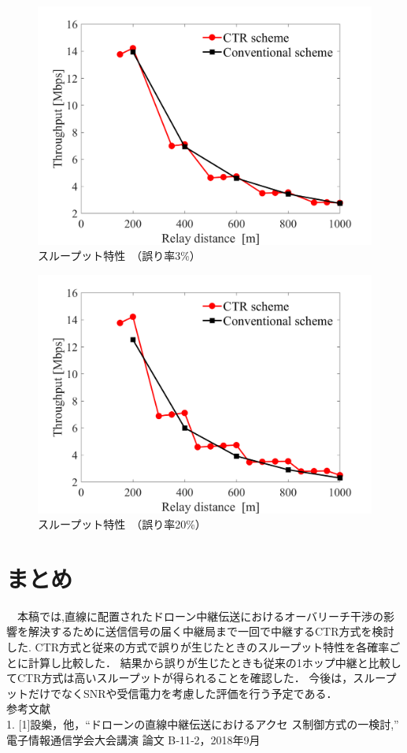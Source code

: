 \documentclass[a4paper,10pt]{ltjsarticle}
\begin{document}
\begin{figure}[H]
  \centering
  \includegraphics[width=\linewidth]{throughput_probabilistic_retry_0.03.png} %
  \caption{スループット特性　（誤り率3\%）}
  \label{fig:throughput_0.03} %
\end{figure}
\begin{figure}[H]
  \centering
  \includegraphics[width=\linewidth]{throughput_probabilistic_retry_0.2.png} %
  \caption{スループット特性　（誤り率20\%）}
  \label{fig:throughput_0.2} %
\end{figure}
\section{まとめ}
　本稿では,直線に配置されたドローン中継伝送におけるオーバリーチ干渉の影響を解決するために送信信号の届く中継局まで一回で中継するCTR方式を検討した.
CTR方式と従来の方式で誤りが生じたときのスループット特性を各確率ごとに計算し比較した．
結果から誤りが生じたときも従来の1ホップ中継と比較してCTR方式は高いスループットが得られることを確認した．
今後は，スループットだけでなくSNRや受信電力を考慮した評価を行う予定である．
\\参考文献
\\1. [1]設樂，他，“ドローンの直線中継伝送におけるアクセ
ス制御方式の一検討,” 電子情報通信学会大会講演
論文 B‐11‐2，2018年9月

\end{document}
